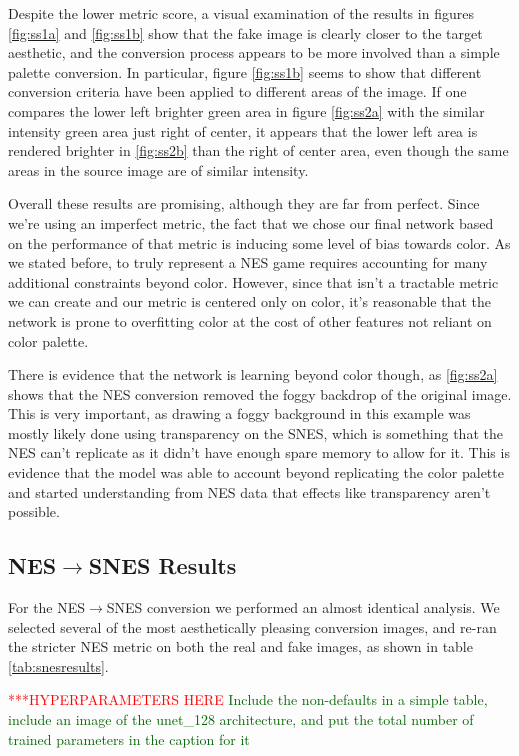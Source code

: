\documentclass[10pt,twocolumn,letterpaper]{article}
\begin{document}
Despite the lower metric score, a visual examination of the results in figures \ref{fig:ss1a} and \ref{fig:ss1b} show that the fake image is clearly closer to the target aesthetic, and the conversion process appears to be more involved than a simple palette conversion.
In particular, figure \ref{fig:ss1b} seems to show that different conversion criteria have been applied to different areas of the image. If one compares the lower left brighter green area in figure \ref{fig:ss2a} with the similar intensity green area just right of center, it appears that the lower left area is rendered brighter in \ref{fig:ss2b} than the right of center area, even though the same areas in the source image are of similar intensity.

Overall these results are promising, although they are far from perfect. Since we're using an imperfect metric, the fact that we chose our final network based on the performance of that metric is inducing some level of bias towards color. As we stated before, to truly represent a NES game requires accounting for many additional constraints beyond color. However, since that isn't a tractable metric we can create and our metric is centered only on color, it's reasonable that the network is prone to overfitting color at the cost of other features not reliant on color palette.

There is evidence that the network is learning beyond color though, as \ref{fig:ss2a} shows that the NES conversion removed the foggy backdrop of the original image. This is very important, as drawing a foggy background in this example was mostly likely done using transparency on the SNES, which is something that the NES can't replicate as it didn't have enough spare memory to allow for it. This is evidence that the model was able to account beyond replicating the color palette and started understanding from NES data that effects like transparency aren't possible.



\subsection{NES$\rightarrow$SNES Results}

For the NES$\rightarrow$SNES conversion we performed an almost identical analysis. We selected several of the most aesthetically pleasing conversion images, and re-ran the stricter NES metric on both the real and fake images, as shown in table \ref{tab:snesresults}.

\textcolor{red}{***HYPERPARAMETERS HERE}
\textcolor{darkgreen} {Include the non-defaults in a simple table, include an image of the unet\_128 architecture, and put the total number of trained parameters in the caption for it}
\end{document}
